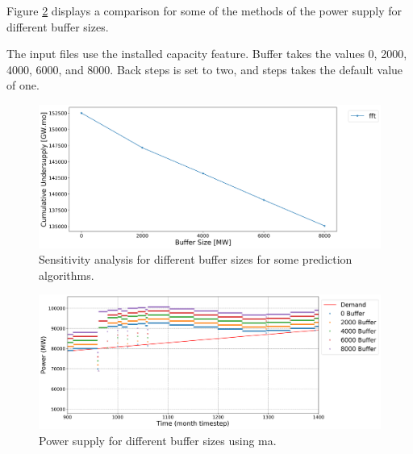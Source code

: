 \documentclass[11pt]{article}
\begin{document}
Figure \ref{fig:30-buf-fft} displays a comparison for some of the methods of the power supply for different buffer sizes.

The input files use the installed capacity feature. Buffer takes the values 0, 2000, 4000, 6000, and 8000. Back steps is set to two, and steps takes the default value of one.

\begin{figure}[H]
	\centering
	\includegraphics[width=\textwidth]{30-figures/30-sens-buffer.png} 
	\hfill
	\caption{Sensitivity analysis for different buffer sizes for some prediction algorithms.}
	\label{fig:30-buff}
\end{figure}

\begin{figure}[H]
	\centering
	\includegraphics[width=\textwidth]{30-figures/30-power-buffer-fft.png} 
	\hfill
	\caption{Power supply for different buffer sizes using ma.}
	\label{fig:30-buf-fft}
\end{figure}
\end{document}

